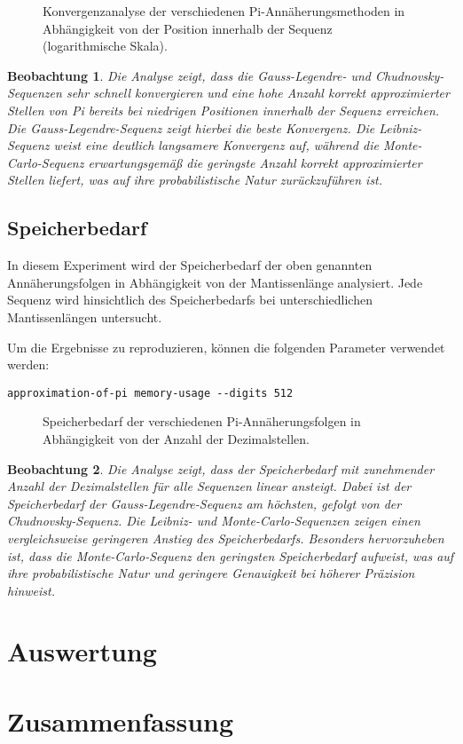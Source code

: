 \documentclass{scrartcl}
\newtheorem{approximation sequence}{Annäherungsfolge}
\newtheorem{observation}{Beobachtung}
\begin{document}
\begin{figure}[H]
    \centering
    
    \caption{Konvergenzanalyse der verschiedenen Pi-Annäherungsmethoden in Abhängigkeit von der Position innerhalb der Sequenz (logarithmische Skala).}
    \label{fig:convergence-analysis}
\end{figure}

\begin{observation}
    Die Analyse zeigt, dass die Gauss-Legendre- und Chudnovsky-Sequenzen sehr
    schnell konvergieren und eine hohe Anzahl korrekt approximierter Stellen von Pi
    bereits bei niedrigen Positionen innerhalb der Sequenz erreichen.
    Die Gauss-Legendre-Sequenz zeigt hierbei die beste Konvergenz.
    Die Leibniz-Sequenz weist eine deutlich langsamere Konvergenz auf, während die
    Monte-Carlo-Sequenz erwartungsgemäß die geringste Anzahl korrekt approximierter
    Stellen liefert, was auf ihre probabilistische Natur zurückzuführen ist.
\end{observation}

\subsection{Speicherbedarf}

In diesem Experiment wird der Speicherbedarf der oben genannten
Annäherungsfolgen in Abhängigkeit von der Mantissenlänge analysiert.
Jede Sequenz wird hinsichtlich des Speicherbedarfs bei unterschiedlichen
Mantissenlängen untersucht.

Um die Ergebnisse zu reproduzieren, können die folgenden Parameter verwendet
werden:
\begin{verbatim}
approximation-of-pi memory-usage --digits 512
\end{verbatim}

\begin{figure}[H]
    \centering
    
    \caption{Speicherbedarf der verschiedenen Pi-Annäherungsfolgen in Abhängigkeit von der Anzahl der Dezimalstellen.}
    \label{fig:memory-usage}
\end{figure}

\begin{observation}
    Die Analyse zeigt, dass der Speicherbedarf mit zunehmender Anzahl der
    Dezimalstellen für alle Sequenzen linear ansteigt.
    Dabei ist der Speicherbedarf der Gauss-Legendre-Sequenz am höchsten, gefolgt
    von der Chudnovsky-Sequenz.
    Die Leibniz- und Monte-Carlo-Sequenzen zeigen einen vergleichsweise geringeren
    Anstieg des Speicherbedarfs.
    Besonders hervorzuheben ist, dass die Monte-Carlo-Sequenz den geringsten
    Speicherbedarf aufweist, was auf ihre probabilistische Natur und geringere
    Genauigkeit bei höherer Präzision hinweist.
\end{observation}

\section{Auswertung}

\section{Zusammenfassung}

\printbibliography
\end{document}
